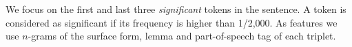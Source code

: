 We focus on the first and last three \textit{significant} tokens in the sentence. %
A token is considered as significant if its frequency is higher than  1/2,000.
As features we use $n$-grams of the surface form, lemma and part-of-speech tag of each triplet. 
%
%


